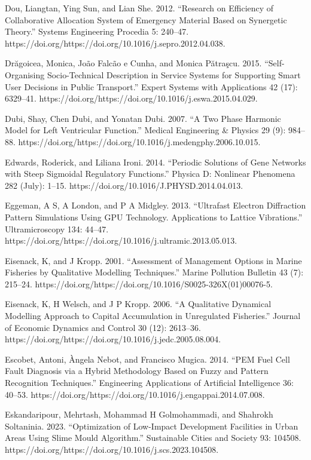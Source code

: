 \documentclass[utf8]{gradu3}
\begin{document}
Dou, Liangtan, Ying Sun, and Lian She. 2012. “Research on Efficiency of Collaborative Allocation System of Emergency Material Based on Synergetic Theory.” Systems Engineering Procedia 5: 240–47. https://doi.org/https://doi.org/10.1016/j.sepro.2012.04.038.

Drăgoicea, Monica, João Falcão e Cunha, and Monica Pătraşcu. 2015. “Self-Organising Socio-Technical Description in Service Systems for Supporting Smart User Decisions in Public Transport.” Expert Systems with Applications 42 (17): 6329–41. https://doi.org/https://doi.org/10.1016/j.eswa.2015.04.029.

Dubi, Shay, Chen Dubi, and Yonatan Dubi. 2007. “A Two Phase Harmonic Model for Left Ventricular Function.” Medical Engineering \& Physics 29 (9): 984–88. https://doi.org/https://doi.org/10.1016/j.medengphy.2006.10.015.

Edwards, Roderick, and Liliana Ironi. 2014. “Periodic Solutions of Gene Networks with Steep Sigmoidal Regulatory Functions.” Physica D: Nonlinear Phenomena 282 (July): 1–15. https://doi.org/10.1016/J.PHYSD.2014.04.013.

Eggeman, A S, A London, and P A Midgley. 2013. “Ultrafast Electron Diffraction Pattern Simulations Using GPU Technology. Applications to Lattice Vibrations.” Ultramicroscopy 134: 44–47. https://doi.org/https://doi.org/10.1016/j.ultramic.2013.05.013.

Eisenack, K, and J Kropp. 2001. “Assessment of Management Options in Marine Fisheries by Qualitative Modelling Techniques.” Marine Pollution Bulletin 43 (7): 215–24. https://doi.org/https://doi.org/10.1016/S0025-326X(01)00076-5.

Eisenack, K, H Welsch, and J P Kropp. 2006. “A Qualitative Dynamical Modelling Approach to Capital Accumulation in Unregulated Fisheries.” Journal of Economic Dynamics and Control 30 (12): 2613–36. https://doi.org/https://doi.org/10.1016/j.jedc.2005.08.004.

Escobet, Antoni, Àngela Nebot, and Francisco Mugica. 2014. “PEM Fuel Cell Fault Diagnosis via a Hybrid Methodology Based on Fuzzy and Pattern Recognition Techniques.” Engineering Applications of Artificial Intelligence 36: 40–53. https://doi.org/https://doi.org/10.1016/j.engappai.2014.07.008.

Eskandaripour, Mehrtash, Mohammad H Golmohammadi, and Shahrokh Soltaninia. 2023. “Optimization of Low-Impact Development Facilities in Urban Areas Using Slime Mould Algorithm.” Sustainable Cities and Society 93: 104508. https://doi.org/https://doi.org/10.1016/j.scs.2023.104508.
\end{document}
